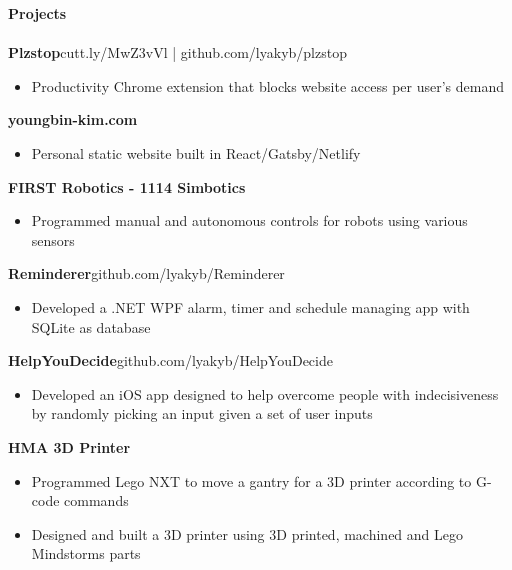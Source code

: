 \documentclass[a4paper]{article}
\newcommand{\lineunder} {
    \vspace{-8pt} \\
    \hspace{-18pt} \hrulefill \\
}
\newcommand{\header} [1] {
    {\hspace{-18pt}\vspace*{6pt} \textcolor{headerGray}{\textbf{\large{#1}}}}
    \vspace{-6pt} \lineunder
}
\begin{document}
\header{Projects}
{\textbf{\normalsize Plzstop}}\hfill \textcolor{dateGray}{cutt.ly/MwZ3vVl      |      github.com/lyakyb/plzstop}\\
\vspace{-2mm}
\begin{itemize}[leftmargin= 1cm]\itemsep -0.5pt
	\item Productivity Chrome extension that blocks website access per user's demand
\end{itemize}
\vspace{-1mm}
{\textbf{\normalsize youngbin-kim.com}}\\
\vspace{-2mm}
\begin{itemize}[leftmargin= 1cm]\itemsep -0.5pt
	\item Personal static website built in React/Gatsby/Netlify
\end{itemize}
\vspace{-1mm}
{\textbf{\normalsize FIRST Robotics - 1114 Simbotics}}\\
\vspace{-2mm}
\begin{itemize}[leftmargin=1cm ]\itemsep -0.5pt
	\item Programmed manual and autonomous controls for robots using various sensors
\end{itemize}
\vspace{-1mm}
{\textbf{\normalsize Reminderer}}\hfill \textcolor{dateGray}{github.com/lyakyb/Reminderer}\\
\vspace{-2mm}
\begin{itemize}[leftmargin=1cm ]\itemsep -0.5pt
	\item Developed a .NET WPF alarm, timer and schedule managing app with SQLite as database
\end{itemize}
\vspace{-1mm}
{\textbf{\normalsize HelpYouDecide}}\hfill \textcolor{dateGray}{github.com/lyakyb/HelpYouDecide}\\
\vspace{-2mm}
\begin{itemize}[leftmargin=1cm ]\itemsep -0.5pt
	\item Developed an iOS app designed to help overcome people with indecisiveness by randomly picking an input given a set of user inputs
\end{itemize}
{\textbf{\normalsize HMA 3D Printer}}\\
\vspace{-2.5mm}
\begin{itemize}[leftmargin=1cm ]\itemsep -0.5pt
	\item Programmed Lego NXT to move a gantry for a 3D printer according to G-code commands
	\item Designed and built a 3D printer using 3D printed, machined and Lego Mindstorms parts
\end{itemize}
\vspace{1mm}
\end{document}
